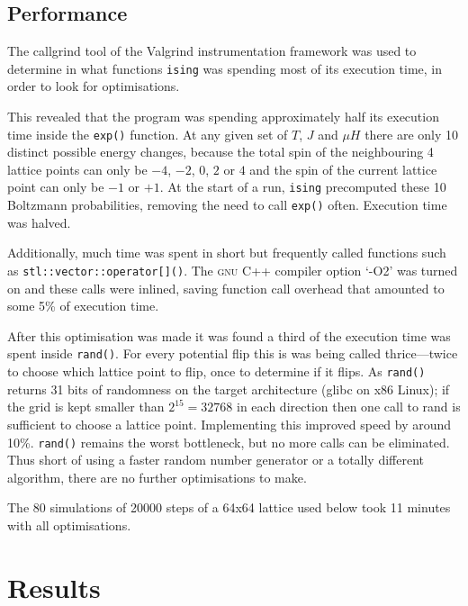 \documentclass[12pt,a4paper,english]{article}
\begin{document}
\subsection{Performance}
The callgrind tool of the Valgrind instrumentation framework \cite{valgrind} was used to determine in what functions \texttt{ising} was spending most of its execution time, in order to look for optimisations.

This revealed that the program was spending approximately half its execution time inside the \texttt{exp()} function. At any given set of $T$, $J$ and $\mu H$ there are only 10 distinct possible energy changes, because the total spin of the neighbouring 4 lattice points can only be $-4$, $-2$, $0$, $2$ or $4$ and the spin of the current lattice point can only be $-1$ or $+1$.  At the start of a run, \texttt{ising} precomputed these 10 Boltzmann probabilities, removing the need to call \texttt{exp()} often.  Execution time was halved.

Additionally, much time was spent in short but frequently called functions such as \texttt{stl::vector::operator[]()}.  The \textsc{gnu} C++ compiler option `-O2' was turned on and these calls were inlined, saving function call overhead that amounted to some 5\% of execution time.

After this optimisation was made it was found a third of the execution time was spent inside \texttt{rand()}. For every potential flip this is was being called thrice---twice to choose which lattice point to flip, once to determine if it flips.  As \texttt{rand()} returns 31 bits of randomness on the target architecture (glibc on x86 Linux); if the grid is kept smaller than $2^{15}=32768$ in each direction then one call to rand is sufficient to choose a lattice point.  Implementing this improved speed by around 10\%. \texttt{rand()} remains the worst bottleneck, but no more calls can be eliminated.  Thus short of using a faster random number generator or a totally different algorithm, there are no further optimisations to make.

The 80 simulations of 20000 steps of a 64x64 lattice used below took 11 minutes with all optimisations.

\section{Results}
\label{sec:results}
\end{document}
